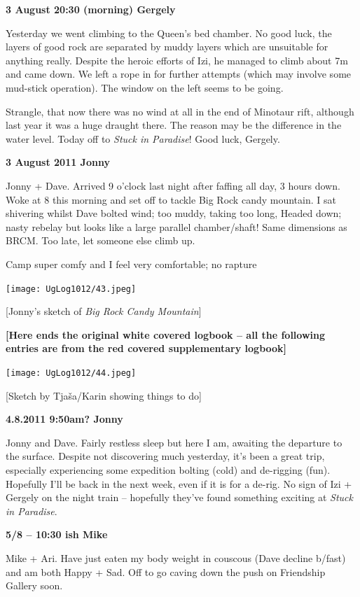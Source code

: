 \textbf{3 August 20:30 (morning) Gergely}

Yesterday we went climbing to the Queen's bed chamber. No good luck, the
layers of good rock are separated by muddy layers which are unsuitable
for anything really. Despite the heroic efforts of Izi, he managed to
climb about 7m and came down. We left a rope in for further attempts
(which may involve some mud-stick operation). The window on the left
seems to be going.

Strangle, that now there was no wind at all in the end of Minotaur rift,
although last year it was a huge draught there. The reason may be the
difference in the water level. Today off to \emph{Stuck in Paradise}!
Good luck, Gergely.

\textbf{3 August 2011 Jonny}

Jonny + Dave. Arrived 9 o'clock last night after faffing all day, 3
hours down. Woke at 8 this morning and set off to tackle Big Rock candy
mountain. I sat shivering whilst Dave bolted wind; too muddy, taking too
long, Headed down; nasty rebelay but looks like a large parallel
chamber/shaft! Same dimensions as BRCM. Too late, let someone else climb
up.

Camp super comfy and I feel very comfortable; no rapture

\texttt{[image: UgLog1012/43.jpeg]}

{[}Jonny's sketch of \emph{Big Rock Candy Mountain}{]}

\textbf{{[}Here ends the original white covered logbook -- all the
following entries are from the red covered supplementary logbook{]}}

\texttt{[image: UgLog1012/44.jpeg]}

{[}Sketch by Tjaša/Karin showing things to do{]}

\textbf{4.8.2011 9:50am? Jonny}

Jonny and Dave. Fairly restless sleep but here I am, awaiting the
departure to the surface. Despite not discovering much yesterday, it's
been a great trip, especially experiencing some expedition bolting
(cold) and de-rigging (fun). Hopefully I'll be back in the next week,
even if it is for a de-rig. No sign of Izi + Gergely on the night train
-- hopefully they've found something exciting at \emph{Stuck in
Paradise}.

\textbf{5/8 -- 10:30 ish Mike}

Mike + Ari. Have just eaten my body weight in couscous (Dave decline
b/fast) and am both Happy + Sad. Off to go caving down the push on
Friendship Gallery soon.

